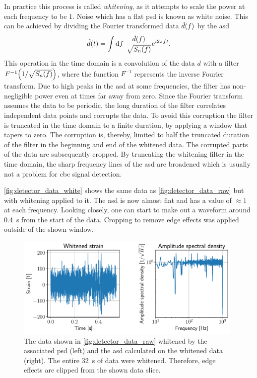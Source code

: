 In practice this process is called \emph{whitening}, as it attempts to scale the power at each frequency to be $1$. Noise which has a flat \acrshort{psd} is known as white noise. This can be achieved by dividing the Fourier transformed data $\tilde{d}{\left( f \right)}$ by the \acrshort{asd}
\begin{equation}
\hat{d}\lr{t} = \int \diff{f}\ \frac{\tilde{d}\lr{f}}{\sqrt{S_n\lr{f}}} e^{i2\pi ft}.
\end{equation}
This operation in the time domain is a convolution of the data $d$ with a filter $F^{-1}{\left( 1/\sqrt{S_n{\left( f \right)}} \right)}$, where the function $F^{-1}$ represents the inverse Fourier transform. Due to high peaks in the \acrshort{asd} at some frequencies, the filter has non-negligible power even at times far away from zero. Since the Fourier transform assumes the data to be periodic, the long duration of the filter correlates independent data points and corrupts the data. To avoid this corruption the filter is truncated in the time domain to a finite duration, by applying a window that tapers to zero. The corruption is, thereby, limited to half the truncated duration of the filter in the beginning and end of the whitened data. The corrupted parts of the data are subsequently cropped. By truncating the whitening filter in the time domain, the sharp frequency lines of the \acrshort{asd} are broadened which is usually not a problem for \acrshort{cbc} signal detection.

\autoref{fig:detector_data_white} shows the same data as \autoref{fig:detector_data_raw} but with whitening applied to it. The \acrshort{asd} is now almost flat and has a value of $\approx 1$ at each frequency. Looking closely, one can start to make out a waveform around \SI{0.4}{\second} from the start of the data. Cropping to remove edge effects was applied outside of the shown window.

\begin{figure}
	\centering
	\includegraphics[width=0.98\textwidth]{chapters/foundations/sections/cbc_searches/images/data_white.pdf}
	\caption[Whitened detector data]{The data shown in \autoref{fig:detector_data_raw} whitened by the associated \acrshort{psd} (left) and the \acrshort{asd} calculated on the whitened data (right). The entire \SI{32}{\second} of data were whitened. Therefore, edge effects are clipped from the shown data slice.}\label{fig:detector_data_white}
\end{figure}


